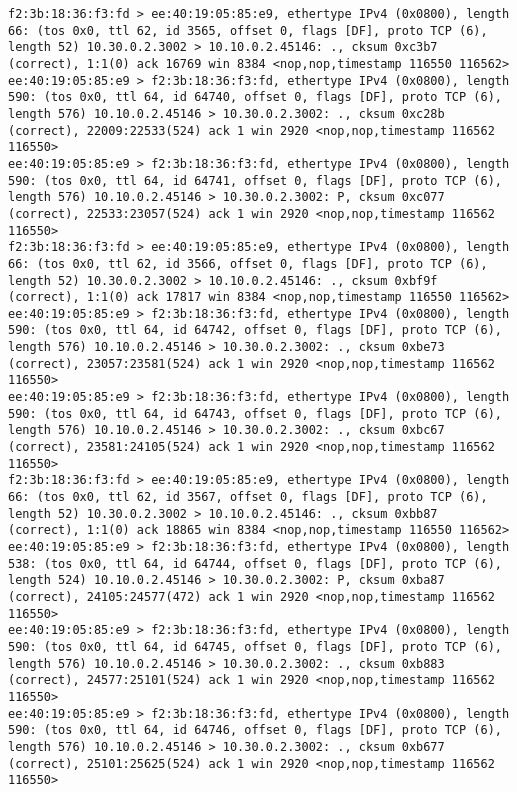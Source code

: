 \documentclass[a4paper,12pt]{article}
\begin{document}
\begin{Verbatim}
f2:3b:18:36:f3:fd > ee:40:19:05:85:e9, ethertype IPv4 (0x0800), length 66: (tos 0x0, ttl 62, id 3565, offset 0, flags [DF], proto TCP (6), length 52) 10.30.0.2.3002 > 10.10.0.2.45146: ., cksum 0xc3b7 (correct), 1:1(0) ack 16769 win 8384 <nop,nop,timestamp 116550 116562>
ee:40:19:05:85:e9 > f2:3b:18:36:f3:fd, ethertype IPv4 (0x0800), length 590: (tos 0x0, ttl 64, id 64740, offset 0, flags [DF], proto TCP (6), length 576) 10.10.0.2.45146 > 10.30.0.2.3002: ., cksum 0xc28b (correct), 22009:22533(524) ack 1 win 2920 <nop,nop,timestamp 116562 116550>
ee:40:19:05:85:e9 > f2:3b:18:36:f3:fd, ethertype IPv4 (0x0800), length 590: (tos 0x0, ttl 64, id 64741, offset 0, flags [DF], proto TCP (6), length 576) 10.10.0.2.45146 > 10.30.0.2.3002: P, cksum 0xc077 (correct), 22533:23057(524) ack 1 win 2920 <nop,nop,timestamp 116562 116550>
f2:3b:18:36:f3:fd > ee:40:19:05:85:e9, ethertype IPv4 (0x0800), length 66: (tos 0x0, ttl 62, id 3566, offset 0, flags [DF], proto TCP (6), length 52) 10.30.0.2.3002 > 10.10.0.2.45146: ., cksum 0xbf9f (correct), 1:1(0) ack 17817 win 8384 <nop,nop,timestamp 116550 116562>
ee:40:19:05:85:e9 > f2:3b:18:36:f3:fd, ethertype IPv4 (0x0800), length 590: (tos 0x0, ttl 64, id 64742, offset 0, flags [DF], proto TCP (6), length 576) 10.10.0.2.45146 > 10.30.0.2.3002: ., cksum 0xbe73 (correct), 23057:23581(524) ack 1 win 2920 <nop,nop,timestamp 116562 116550>
ee:40:19:05:85:e9 > f2:3b:18:36:f3:fd, ethertype IPv4 (0x0800), length 590: (tos 0x0, ttl 64, id 64743, offset 0, flags [DF], proto TCP (6), length 576) 10.10.0.2.45146 > 10.30.0.2.3002: ., cksum 0xbc67 (correct), 23581:24105(524) ack 1 win 2920 <nop,nop,timestamp 116562 116550>
f2:3b:18:36:f3:fd > ee:40:19:05:85:e9, ethertype IPv4 (0x0800), length 66: (tos 0x0, ttl 62, id 3567, offset 0, flags [DF], proto TCP (6), length 52) 10.30.0.2.3002 > 10.10.0.2.45146: ., cksum 0xbb87 (correct), 1:1(0) ack 18865 win 8384 <nop,nop,timestamp 116550 116562>
ee:40:19:05:85:e9 > f2:3b:18:36:f3:fd, ethertype IPv4 (0x0800), length 538: (tos 0x0, ttl 64, id 64744, offset 0, flags [DF], proto TCP (6), length 524) 10.10.0.2.45146 > 10.30.0.2.3002: P, cksum 0xba87 (correct), 24105:24577(472) ack 1 win 2920 <nop,nop,timestamp 116562 116550>
ee:40:19:05:85:e9 > f2:3b:18:36:f3:fd, ethertype IPv4 (0x0800), length 590: (tos 0x0, ttl 64, id 64745, offset 0, flags [DF], proto TCP (6), length 576) 10.10.0.2.45146 > 10.30.0.2.3002: ., cksum 0xb883 (correct), 24577:25101(524) ack 1 win 2920 <nop,nop,timestamp 116562 116550>
ee:40:19:05:85:e9 > f2:3b:18:36:f3:fd, ethertype IPv4 (0x0800), length 590: (tos 0x0, ttl 64, id 64746, offset 0, flags [DF], proto TCP (6), length 576) 10.10.0.2.45146 > 10.30.0.2.3002: ., cksum 0xb677 (correct), 25101:25625(524) ack 1 win 2920 <nop,nop,timestamp 116562 116550>

\end{Verbatim}
\end{document}
